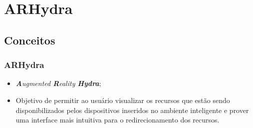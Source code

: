 \documentclass{beamer}
\begin{document}
		
			
			
			
		

\section{ARHydra}

	\subsection{Conceitos}
	
	\begin{frame}
		\frametitle{ARHydra}
		
		
		\begin{itemize}
		  \item \emph{\textbf{A}ugmented \textbf{R}eality \textbf{Hydra}};
		  \item Objetivo de permitir ao usuário visualizar os recursos que
		  		estão sendo disponibilizados pelos dispositivos inseridos no
		  		ambiente inteligente e prover uma interface mais intuitiva para
		  		o redirecionamento dos recursos.
		\end{itemize}
	\end{frame}
	
\end{document}
